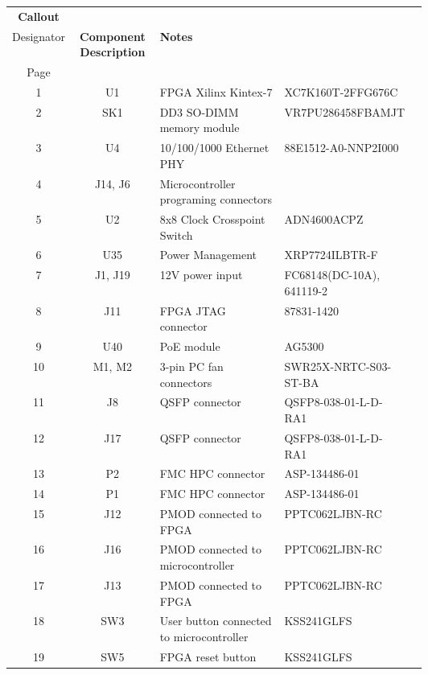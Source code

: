 \documentclass[12pt,oneside,a4]{article}
\begin{document}
\begin{longtable}[htbp]{@{}ccp{0.3\linewidth}p{0.3\linewidth}c@{}}
\toprule
\textbf{Callout} &
  \textbf{\begin{tabular}[c]{@{}c@{}}Reference\\ Designator\end{tabular}} &
  \textbf{Component Description} &
  \textbf{Notes} &
  \textbf{\begin{tabular}[c]{@{}c@{}}Schematic \\ Page\end{tabular}} \\ \midrule

1  & U1  & FPGA Xilinx Kintex-7      & XC7K160T-2FFG676C &  \\
2  & SK1 & DD3 SO-DIMM memory module & VR7PU286458FBAMJT &  \\
3  & U4  & 10/100/1000 Ethernet PHY  & 88E1512-A0-NNP2I000  &  \\
4  & J14, J6 & Microcontroller programing connectors         &                   &  \\
5  & U2  & 8x8 Clock Crosspoint Switch   & ADN4600ACPZ	     &  \\
6  & U35  & Power Management      & XRP7724ILBTR-F   &  \\
7  & J1, J19 & 12V power input       & FC68148(DC-10A), 641119-2  &  \\
8  & J11    & FPGA JTAG connector    & 87831-1420   &  \\
9  & U40  &  PoE module              & AG5300          &  \\
10 & M1, M2 & 3-pin PC fan connectors & SWR25X-NRTC-S03-ST-BA &  \\
11 & J8  & QSFP connector    		 & QSFP8-038-01-L-D-RA1 &  \\
12 & J17 & QSFP connector            & QSFP8-038-01-L-D-RA1   &  \\
13 & P2  & FMC HPC connector         & ASP-134486-01 &  \\
14 & P1  & FMC HPC connector         & ASP-134486-01     &  \\
15 & J12 & PMOD connected to FPGA    & PPTC062LJBN-RC     &  \\
16 & J16 & PMOD connected to microcontroller  & PPTC062LJBN-RC    &  \\
17 & J13 & PMOD connected to FPGA    & PPTC062LJBN-RC    &  \\
18 & SW3 & User button connected to microcontroller      &  KSS241GLFS  &  \\
19 & SW5 & FPGA reset button   		 & KSS241GLFS      &  \\

\end{longtable}
\end{document}
